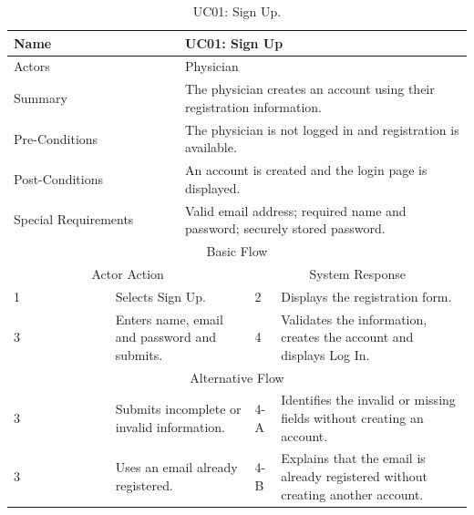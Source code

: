 \begin{table}[htbp]
\centering
\small
\caption{UC01: Sign Up.}
\label{tab:kashaf:uc01}
\begin{tabular}{|p{}|p{}|p{}|p{}|p{}|}
\hline
\multicolumn{2}{|p{\dimexpr0.225\textwidth+2\tabcolsep+\arrayrulewidth\relax}|}{Name} & \multicolumn{3}{p{\dimexpr0.575\textwidth+4\tabcolsep+2\arrayrulewidth\relax}|}{UC01: Sign Up} \\ \hline
\multicolumn{2}{|p{\dimexpr0.225\textwidth+2\tabcolsep+\arrayrulewidth\relax}|}{Actors} & \multicolumn{3}{p{\dimexpr0.575\textwidth+4\tabcolsep+2\arrayrulewidth\relax}|}{Physician} \\ \hline
\multicolumn{2}{|p{\dimexpr0.225\textwidth+2\tabcolsep+\arrayrulewidth\relax}|}{Summary} & \multicolumn{3}{p{\dimexpr0.575\textwidth+4\tabcolsep+2\arrayrulewidth\relax}|}{The physician creates an account using their registration information.} \\ \hline
\multicolumn{2}{|p{\dimexpr0.225\textwidth+2\tabcolsep+\arrayrulewidth\relax}|}{Pre-Conditions} & \multicolumn{3}{p{\dimexpr0.575\textwidth+4\tabcolsep+2\arrayrulewidth\relax}|}{The physician is not logged in and registration is available.} \\ \hline
\multicolumn{2}{|p{\dimexpr0.225\textwidth+2\tabcolsep+\arrayrulewidth\relax}|}{Post-Conditions} & \multicolumn{3}{p{\dimexpr0.575\textwidth+4\tabcolsep+2\arrayrulewidth\relax}|}{An account is created and the login page is displayed.} \\ \hline
\multicolumn{2}{|p{\dimexpr0.225\textwidth+2\tabcolsep+\arrayrulewidth\relax}|}{Special Requirements} & \multicolumn{3}{p{\dimexpr0.575\textwidth+4\tabcolsep+2\arrayrulewidth\relax}|}{Valid email address; required name and password; securely stored password.} \\ \hline
\multicolumn{5}{|c|}{Basic Flow} \\ \hline
\multicolumn{3}{|c|}{Actor Action} & \multicolumn{2}{c|}{System Response} \\ \hline
1 & \multicolumn{2}{p{\dimexpr0.37\textwidth+2\tabcolsep+\arrayrulewidth\relax}|}{Selects Sign Up.} & 2 & Displays the registration form. \\ \hline
3 & \multicolumn{2}{p{\dimexpr0.37\textwidth+2\tabcolsep+\arrayrulewidth\relax}|}{Enters name, email and password and submits.} & 4 & Validates the information, creates the account and displays Log In. \\ \hline
\multicolumn{5}{|c|}{Alternative Flow} \\ \hline
3 & \multicolumn{2}{p{\dimexpr0.37\textwidth+2\tabcolsep+\arrayrulewidth\relax}|}{Submits incomplete or invalid information.} & 4-A & Identifies the invalid or missing fields without creating an account. \\ \hline
3 & \multicolumn{2}{p{\dimexpr0.37\textwidth+2\tabcolsep+\arrayrulewidth\relax}|}{Uses an email already registered.} & 4-B & Explains that the email is already registered without creating another account. \\ \hline
\end{tabular}
\end{table}

